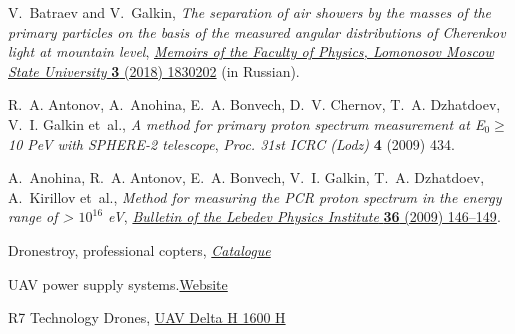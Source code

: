 \documentclass[a4paper,11pt]{article}
\begin{document}
\begin{thebibliography}{10}
V.~Batraev and V.~Galkin, \emph{The separation of air showers by the masses of the primary particles on the basis of the measured angular distributions of Cherenkov light at mountain level}, \href{http://uzmu.phys.msu.ru/file/2018/3/1830202.pdf}{\emph{Memoirs of the Faculty of Physics, Lomonosov Moscow State University} {\bfseries 3} (2018) 1830202} (in Russian).

R.~A. Antonov, A.~Anohina, E.~A. Bonvech, D.~V. Chernov, T.~A. Dzhatdoev, V.~I. Galkin et~al., \emph{A method for primary proton spectrum measurement at E$_0 \ge$ 10 PeV with SPHERE-2 telescope}, {{\emph{{Proc. 31st ICRC (Lodz)}} {\bfseries 4} (2009) 434}}.

A.~Anohina, R.~A. Antonov, E.~A. Bonvech, V.~I. Galkin, T.~A. Dzhatdoev, A.~Kirillov et~al., \emph{Method for measuring the PCR proton spectrum in the energy range of > $10^{16}$ eV},
\href{http://dx.doi.org/10.3103/S1068335609050042}{\emph{Bulletin of the Lebedev Physics Institute} {\bfseries 36} (2009) 146--149}.

{Dronestroy, professional copters}, \href{https://dronestroy.ru/catalog}{\emph{Catalogue}}

{UAV power supply systems.}\href{http://atenergy.pro/en/products/energoobespechenie-bpla.html}{Website}

{R7 Technology Drones,} \href{http://r7dron.ru/}{UAV Delta H 1600 H}

\end{thebibliography}



\end{document}

